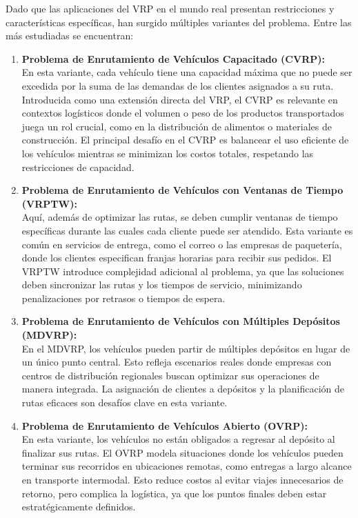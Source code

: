 \documentclass{article}
\begin{document}
Dado que las aplicaciones del VRP en el mundo real presentan restricciones y características específicas, han surgido múltiples variantes del problema. Entre las más estudiadas se encuentran:
\begin{enumerate}
\item
\textbf{Problema de Enrutamiento de Vehículos Capacitado (CVRP):}\\
En esta variante, cada vehículo tiene una capacidad máxima que no puede ser excedida por la suma de las demandas de los clientes asignados a su ruta. Introducida como una extensión directa del VRP, el CVRP es relevante en contextos logísticos donde el volumen o peso de los productos transportados juega un rol crucial, como en la distribución de alimentos o materiales de construcción. El principal desafío en el CVRP es balancear el uso eficiente de los vehículos mientras se minimizan los costos totales, respetando las restricciones de capacidad.\cite{ref6}

\item
\textbf{Problema de Enrutamiento de Vehículos con Ventanas de Tiempo (VRPTW):}\\
Aquí, además de optimizar las rutas, se deben cumplir ventanas de tiempo específicas durante las cuales cada cliente puede ser atendido. Esta variante es común en servicios de entrega, como el correo o las empresas de paquetería, donde los clientes especifican franjas horarias para recibir sus pedidos. El VRPTW introduce complejidad adicional al problema, ya que las soluciones deben sincronizar las rutas y los tiempos de servicio, minimizando penalizaciones por retrasos o tiempos de espera.\cite{ref9}

\item
\textbf{Problema de Enrutamiento de Vehículos con Múltiples Depósitos (MDVRP):}\\
En el MDVRP, los vehículos pueden partir de múltiples depósitos en lugar de un único punto central. Esto refleja escenarios reales donde empresas con centros de distribución regionales buscan optimizar sus operaciones de manera integrada. La asignación de clientes a depósitos y la planificación de rutas eficaces son desafíos clave en esta variante.\cite{ref1}

\item
\textbf{Problema de Enrutamiento de Vehículos Abierto (OVRP):}\\
En esta variante, los vehículos no están obligados a regresar al depósito al finalizar sus rutas. El OVRP modela situaciones donde los vehículos pueden terminar sus recorridos en ubicaciones remotas, como entregas a largo alcance en transporte intermodal. Esto reduce costos al evitar viajes innecesarios de retorno, pero complica la logística, ya que los puntos finales deben estar estratégicamente definidos.


\end{enumerate}
\end{document}
